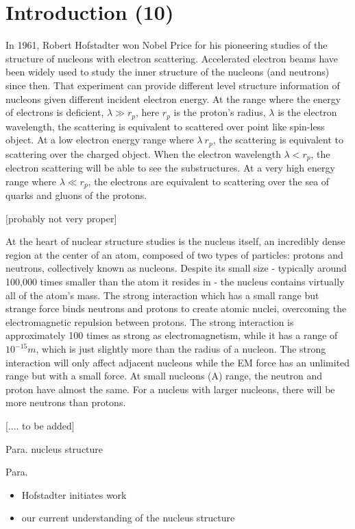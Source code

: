 \chapter{Introduction (10)}

In 1961, Robert Hofstadter won Nobel Price for his pioneering studies of the structure of nucleons with electron scattering. Accelerated electron beams have been widely used to study the inner structure of the nucleons (and neutrons) since then. That experiment can provide different level structure information of nucleons given different incident electron energy. At the range where the energy of electrons is deficient, $\lambda \gg r_p$, here $r_p$ is the proton's radius, $\lambda$ is the electron wavelength, the scattering is equivalent to scattered over point like spin-less object. At a low electron energy range where $\lambda ~r_p$, the scattering is equivalent to scattering over the charged object. When the electron wavelength $\lambda < r_p$, the electron scattering will be able to see the substructures. At a very high energy range where $\lambda \ll r_p$, the electrons are equivalent to scattering over the sea of quarks and gluons of the protons. 

[probably not very proper]

At the heart of nuclear structure studies is the nucleus itself, an incredibly dense region at the center of an atom, composed of two types of particles: protons and neutrons, collectively known as nucleons. Despite its small size - typically around 100,000 times smaller than the atom it resides in - the nucleus contains virtually all of the atom's mass. The strong interaction which has a small range but strange force binds neutrons and protons to create atomic nuclei, overcoming the electromagnetic repulsion between protons. The strong interaction is approximately 100 times as strong as electromagnetism, while it has a range of $10^{-15}m$, which is just slightly more than the radius of a nucleon. The strong interaction will only affect adjacent nucleons while the EM force has an unlimited range but with a small force. At small nucleons (A) range, the neutron and proton have almost the same. For a nucleus with larger nucleons, there will be more neutrons than protons. 

[.... to be added]







Para. nucleus structure

Para. 
\begin{itemize}
    \item Hofstadter initiates work
    \item our current understanding of the nucleus structure
\end{itemize}

